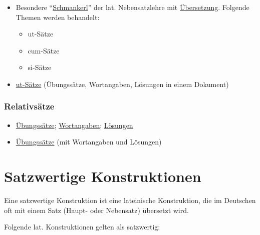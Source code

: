 \documentclass{scrartcl}
\begin{document}
\begin{itemize}
\item Besondere "`\href{https://www.dropbox.com/s/qundz0kc7wi3sp0/grammatik.pdf?dl=0}{Schmankerl}"' der lat. Nebensatzlehre mit
\href{https://www.dropbox.com/s/rv0zs8gtuk155ho/Grammatikrepetition\_\%25C3\%259Cbersetzung.pdf?dl=0}{Übersetzung}. Folgende Themen werden behandelt:
\begin{itemize}
\item ut-Sätze
\item cum-Sätze
\item si-Sätze
\end{itemize}
\item \href{https://www.dropbox.com/s/smmjy9k0a33qfwm/\%25C2\%25A751ut.pdf?dl=0}{ut-Sätze} (Übungssätze, Wortangaben, Lösungen in einem Dokument)
\end{itemize}

\subsubsection{Relativsätze}
\label{sec:org140b297}

\begin{itemize}
\item \href{https://www.dropbox.com/s/60ggp3yeav4ofe8/Relativs\%25C3\%25A4tze.pdf?dl=0}{Übungssätze}; \href{https://www.dropbox.com/s/ipz22adwi00i8o8/\%25C2\%25A747Relativs\%25C3\%25A4tze.pdf?dl=0}{Wortangaben}; \href{https://www.dropbox.com/s/fttk7f0dwqlrag9/Relativs\%25C3\%25A4tze\_L\%25C3\%25B6sung.pdf?dl=0}{Lösungen}
\item \href{https://www.dropbox.com/s/xxtjdft670v04y2/Relativsatz.pdf?dl=0}{Übungssätze} (mit Wortangaben und Lösungen)
\end{itemize}

\section{Satzwertige Konstruktionen}
\label{sec:orgcc51e5e}
Eine satzwertige Konstruktion ist eine lateinische Konstruktion, die
im Deutschen oft mit einem Satz (Haupt- oder Nebensatz) übersetzt
wird.

Folgende lat. Konstruktionen gelten als satzwertig:
\end{document}
